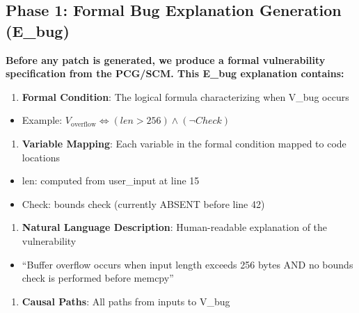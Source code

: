 \documentclass[conference,compsoc]{IEEEtran}
\providecommand{\tightlist}{\setlength{\itemsep}{0pt}\setlength{\parskip}{0pt}}
\begin{document}
\subsection{Phase 1: Formal Bug Explanation Generation
(E\_bug)}\label{phase-1-formal-bug-explanation-generation-e_bug}

\textbf{Before any patch is generated, we produce a formal vulnerability
specification from the PCG/SCM. This E\_bug explanation contains:}

\begin{enumerate}
\def\labelenumi{\arabic{enumi}.}
\tightlist
\item
  \textbf{Formal Condition}: The logical formula characterizing when
  V\_bug occurs
\end{enumerate}

\begin{itemize}
\tightlist
\item
  Example: $V_{\text{overflow}} \Leftrightarrow (len > 256) \land (\lnot Check)$
\end{itemize}

\begin{enumerate}
\def\labelenumi{\arabic{enumi}.}
\setcounter{enumi}{1}
\tightlist
\item
  \textbf{Variable Mapping}: Each variable in the formal condition
  mapped to code locations
\end{enumerate}

\begin{itemize}
\item
  len: computed from user\_input at line 15
\item
  Check: bounds check (currently ABSENT before line 42)
\end{itemize}

\begin{enumerate}
\def\labelenumi{\arabic{enumi}.}
\setcounter{enumi}{2}
\tightlist
\item
  \textbf{Natural Language Description}: Human-readable explanation of
  the vulnerability
\end{enumerate}

\begin{itemize}
\tightlist
\item
  ``Buffer overflow occurs when input length exceeds 256 bytes AND no
  bounds check is performed before memcpy''
\end{itemize}

\begin{enumerate}
\def\labelenumi{\arabic{enumi}.}
\setcounter{enumi}{3}
\tightlist
\item
  \textbf{Causal Paths}: All paths from inputs to V\_bug
\end{enumerate}
\end{document}
